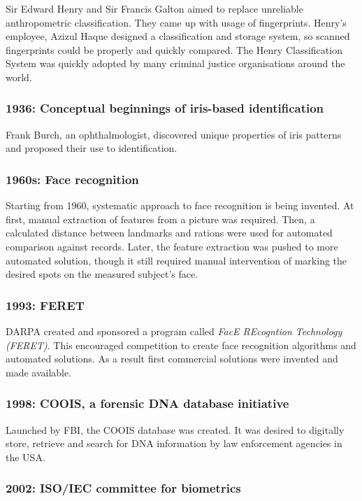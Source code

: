 Sir Edward Henry and Sir Francis Galton aimed to replace unreliable anthropometric classification. They came up with usage of fingerprints. Henry's employee, Azizul Haque designed a classification and storage system, so scanned fingerprints could be properly and quickly compared. The Henry Classification System was quickly adopted by many criminal justice organisations around the world.

\subsubsection{1936: Conceptual beginnings of iris-based identification}

Frank Burch, an ophthalmologist, discovered unique properties of iris patterns and proposed their use to identification.

\subsubsection{1960s: Face recognition}

Starting from 1960, systematic approach to face recognition is being invented. At first, manual extraction of features from a picture was required. Then, a calculated distance between landmarks and rations were used for automated comparison against records. Later, the feature extraction was pushed to more automated solution, though it still required manual intervention of marking the desired spots on the measured subject's face.

\subsubsection{1993: FERET}

DARPA created and sponsored a program called \textit{FacE REcogntion Technology (FERET)}. This encouraged competition to create face recognition algorithms and automated solutions. As a result first commercial solutions were invented and made available.

\subsubsection{1998: COOIS, a forensic DNA database initiative}

Launched by FBI, the COOIS database was created. It was desired to digitally store, retrieve and search for DNA information by law enforcement agencies in the USA.

\subsubsection{2002: ISO/IEC committee for biometrics}

